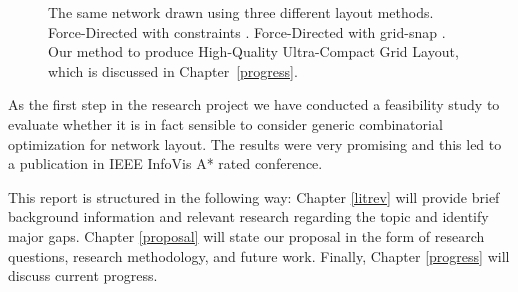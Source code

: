 \documentclass[a4paper,11pt,phdthesis,singlespace,twoside]{cssethesis}
\begin{document}
	\begin{figure}
\centering
{}
\end{figure}
\begin{figure}
\ContinuedFloat
\centering
{}
\caption{The same network drawn using three different layout methods. Force-Directed with constraints \cite{dwyer2006ipsep}. Force-Directed with grid-snap \cite{kieffer2013incremental}. Our method \cite{Yoghourdjian2015high} to produce High-Quality Ultra-Compact Grid Layout, which is discussed in Chapter~\ref{progress}.}
\label{fig:lesmis}
\end{figure}

As the first step in the research project we have conducted a feasibility study to evaluate whether it is in fact sensible to consider generic combinatorial optimization for network layout. The results were very promising and this led to a publication in IEEE InfoVis A* rated conference.

This report is structured in the following way: Chapter \ref{litrev} will provide brief background information and relevant research regarding the topic and identify major gaps. Chapter \ref{proposal} will state our proposal in the form of research questions, research methodology, and future work. Finally, Chapter \ref{progress} will discuss current progress.

\end{document}
